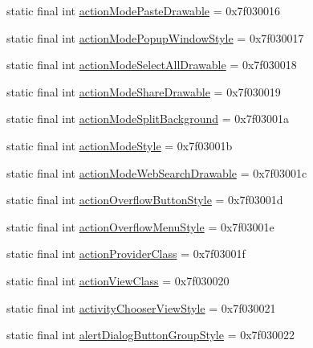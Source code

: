 \begin{DoxyCompactItemize}
\item 
static final int \mbox{\hyperlink{classcom_1_1synnapps_1_1carouselview_1_1_r_1_1attr_a342c80d93c5435aaa051a03192ea9796}{action\+Mode\+Paste\+Drawable}} = 0x7f030016
\item 
static final int \mbox{\hyperlink{classcom_1_1synnapps_1_1carouselview_1_1_r_1_1attr_a0e830e7d7e8b35847c655f4351967461}{action\+Mode\+Popup\+Window\+Style}} = 0x7f030017
\item 
static final int \mbox{\hyperlink{classcom_1_1synnapps_1_1carouselview_1_1_r_1_1attr_a5b173617711f196748e5b5efeadadd2a}{action\+Mode\+Select\+All\+Drawable}} = 0x7f030018
\item 
static final int \mbox{\hyperlink{classcom_1_1synnapps_1_1carouselview_1_1_r_1_1attr_a477a8355a4ca582450fac9adde202cf2}{action\+Mode\+Share\+Drawable}} = 0x7f030019
\item 
static final int \mbox{\hyperlink{classcom_1_1synnapps_1_1carouselview_1_1_r_1_1attr_a01f2007d4c8be06a7cca99a3595a91a7}{action\+Mode\+Split\+Background}} = 0x7f03001a
\item 
static final int \mbox{\hyperlink{classcom_1_1synnapps_1_1carouselview_1_1_r_1_1attr_a944ab0fac5a644483be1a76b2606c970}{action\+Mode\+Style}} = 0x7f03001b
\item 
static final int \mbox{\hyperlink{classcom_1_1synnapps_1_1carouselview_1_1_r_1_1attr_a1b9f85a3582a90a2ff858b01e602dd2e}{action\+Mode\+Web\+Search\+Drawable}} = 0x7f03001c
\item 
static final int \mbox{\hyperlink{classcom_1_1synnapps_1_1carouselview_1_1_r_1_1attr_a236150ca8e1c49348931b9811dc92a5f}{action\+Overflow\+Button\+Style}} = 0x7f03001d
\item 
static final int \mbox{\hyperlink{classcom_1_1synnapps_1_1carouselview_1_1_r_1_1attr_a3633c261730bfef9fb8e6805343534f3}{action\+Overflow\+Menu\+Style}} = 0x7f03001e
\item 
static final int \mbox{\hyperlink{classcom_1_1synnapps_1_1carouselview_1_1_r_1_1attr_aab9d0dea50bf5c25921b81421d53962c}{action\+Provider\+Class}} = 0x7f03001f
\item 
static final int \mbox{\hyperlink{classcom_1_1synnapps_1_1carouselview_1_1_r_1_1attr_aeec5f76aa77a7e93b06cc3b88c391e58}{action\+View\+Class}} = 0x7f030020
\item 
static final int \mbox{\hyperlink{classcom_1_1synnapps_1_1carouselview_1_1_r_1_1attr_a299eafdc392b698319593060a45b1bf9}{activity\+Chooser\+View\+Style}} = 0x7f030021
\item 
static final int \mbox{\hyperlink{classcom_1_1synnapps_1_1carouselview_1_1_r_1_1attr_ab9188f5c1a610fd8b9f5d2d509203ed9}{alert\+Dialog\+Button\+Group\+Style}} = 0x7f030022

\end{DoxyCompactItemize}
